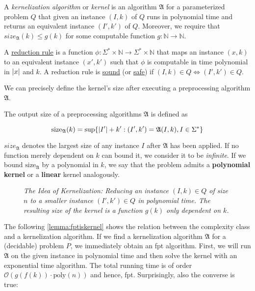 \begin{definition}
A \textit{kernelization algorithm} or \textit{kernel} is an algorithm $\mathfrak{A}$ for a parameterized problem $Q$ that given an instance $(I,k)$ of $Q$ runs in polynomial time and returns an equivalent instance $(I', k')$ of $Q$. 
Moreover, we require that $size_{\mathfrak{A}}(k) \leq g(k)$ for some computable function $g:\mathbb{N} \rightarrow \mathbb{N}$.

A \underline{reduction rule} is a function $\phi:\Sigma^* \times \mathbb{N} \rightarrow \Sigma^* \times \mathbb{N}$ that maps an instance $(x,k)$ to an equivalent instance $(x',k')$ such that $\phi$ is computable in time polynomial in $\abs{x}$ and $k$.
A reduction rule is \underline{sound} (or \underline{safe}) if $(I, k) \in Q \Leftrightarrow (I',k') \in Q$.
\end{definition}

We can precisely define the kernel's size after executing a preprocessing algorithm $\mathfrak{A}$.

\begin{definition} The output size of a preprocessing algorithms $\mathfrak{A}$ is defined as 

    \[\mathrm{size}_{\mathfrak{A}}(k) = \sup\{\abs{I'} + k': (I',k')= \mathfrak{A}(I,k), I \in \Sigma^* \} \]
\end{definition}


$size_{\mathfrak{A}}$ denotes the largest size of any instance $I$ after $\mathfrak{A}$ has been applied.
If no function merely dependent on $k$ can bound it, we consider it to be \emph{infinite}.
If we bound $\mathrm{size}_{\mathfrak{A}}$ by a polynomial in $k$, we say that the problem admits a \textbf{polynomial kernel} or a \textbf{linear} kernel analogously.

\begin{figure}
    \centering
    
    \caption{\textit{The Idea of Kernelization: Reducing an instance $(I,k) \in Q$ of size $n$ to a smaller instance $(I', k') \in Q$ in polynomial time. 
    The resulting size of the kernel is a function $g(k)$ only dependent on $k$.}
    }
    \label{fig:kernelization}
\end{figure}
The following \cref{lemma:fptiskernel} shows the relation between the complexity class \FPT and a kernelization algorithm. 
If we find a kernelization algorithm $\mathfrak{A}$ for a (decidable) problem $P$, we immediately obtain an fpt algorithm.
First, we will run $\mathfrak{A}$ on the given instance in polynomial time and then solve the kernel with an exponential time algorithm.
The total running time is of order $\mathcal{O}(g(f(k)) \cdot \mathrm{poly}(n))$ and hence, fpt.
Surprisingly, also the converse is true:

